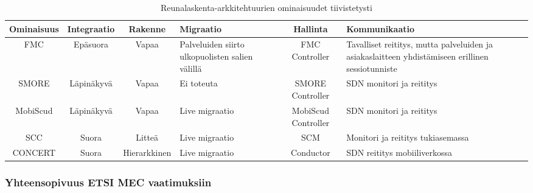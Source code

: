 \begin{landscape}
    \noindent
\begin{table}[!ht]
\caption{Reunalaskenta-arkkitehtuurien ominaisuudet tiivistetysti}
\label{table:features}
\begin{tabularx}{ \hsize }{ | c | c | c | p{3cm} | c | X | }
\hline 
 \textbf{Ominaisuus} & \textbf{Integraatio} & \textbf{Rakenne} & \textbf{Migraatio} & \textbf{Hallinta} & \textbf{Kommunikaatio} \\ 
\hline 
 FMC & Epäsuora & Vapaa & Palveluiden siirto ulkopuolisten salien välillä & FMC Controller & Tavalliset reititys, mutta palveluiden ja asiakaslaitteen yhdistämiseen erillinen sessiotunniste \\ 
\hline 
 SMORE & Läpinäkyvä & Vapaa & Ei toteuta & SMORE Controller & SDN monitori ja reititys \\ 
\hline 
MobiScud & Läpinäkyvä & Vapaa & Live migraatio & MobiScud Controller & SDN monitori ja reititys\\ 
\hline 
SCC & Suora & Litteä & Live migraatio & SCM & Monitori ja reititys tukiasemassa \\ 
\hline 
CONCERT & Suora & Hierarkkinen & Live migraatio & Conductor & SDN reititys mobiiliverkossa \\ 
\hline 
\end{tabularx} 
\end{table}
\end{landscape}

\subsubsection{Yhteensopivuus ETSI MEC vaatimuksiin}



